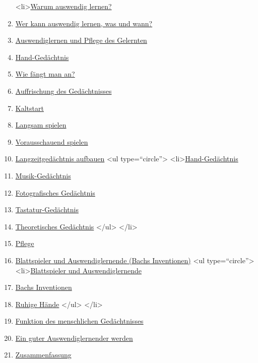   \begin{enumerate}[label={\alph*.}] 
   <li>\hyperref[c1iii6a]{Warum auswendig lernen?}
   \item \hyperref[c1iii6b]{Wer kann auswendig lernen, was und wann?}
   \item \hyperref[c1iii6c]{Auswendiglernen und Pflege des Gelernten}
   \item \hyperref[c1iii6d]{Hand-Gedächtnis}
   \item \hyperref[c1iii6e]{Wie fängt man an?}
   \item \hyperref[c1iii6f]{Auffrischung des Gedächtnisses}
   \item \hyperref[c1iii6g]{Kaltstart}
   \item \hyperref[c1iii6h]{Langsam spielen}
   \item \hyperref[c1iii6i]{Vorausschauend spielen}
   \item \hyperref[c1iii6j]{Langzeitgedächtnis aufbauen}
    <ul type=\enquote{circle}>
     <li>\hyperref[c1iii6hand]{Hand-Gedächtnis}
     \item \hyperref[c1iii6musik]{Musik-Gedächtnis}
     \item \hyperref[c1iii6foto]{Fotografisches Gedächtnis}
     \item \hyperref[c1iii6tastatur]{Tastatur-Gedächtnis}
     \item \hyperref[c1iii6theorie]{Theoretisches Gedächtnis}
    </ul>
   </li>
   \item \hyperref[c1iii6k]{Pflege}
   \item \hyperref[c1iii6l]{Blattspieler und Auswendiglernende (Bachs Inventionen)}
    <ul type=\enquote{circle}>
     <li>\hyperref[c1iii6l]{Blattspieler und Auswendiglernende}
     \item \hyperref[c1iii6l2]{Bachs Inventionen}
     \item \hyperref[ruhig]{Ruhige Hände}
    </ul>
   </li>
   \item \hyperref[c1iii6m]{Funktion des menschlichen Gedächtnisses}
   \item \hyperref[c1iii6n]{Ein guter Auswendiglernender werden}
   \item \hyperref[c1iii6o]{Zusammenfassung}
   \end{enumerate}
